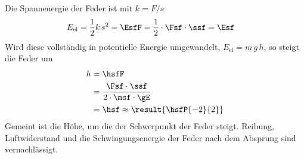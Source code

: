 Die Spannenergie der Feder ist mit $k = F/s$
\begin{align}
 E_\mathrm{el} &= \frac{1}{2}k\,s^2 = \EsfF = \frac{1}{2}\cdot\Fsf\cdot\ssf = \Esf
\end{align}
Wird diese vollständig in potentielle Energie umgewandelt, $E_\mathrm{el} = m\,g\,h$, so steigt die Feder um
\begin{align}
 h &= \hsfF \\
   &= \frac{\Fsf\cdot\ssf}{2\cdot\msf\cdot\gE} \\
   &= \hsf \approx \result{\hsfP{-2}{2}}
\end{align}
Gemeint ist die Höhe, um die der Schwerpunkt der Feder steigt. Reibung, Luftwiderstand und die Schwingungsenergie der Feder nach dem Absprung sind vernachlässigt.
